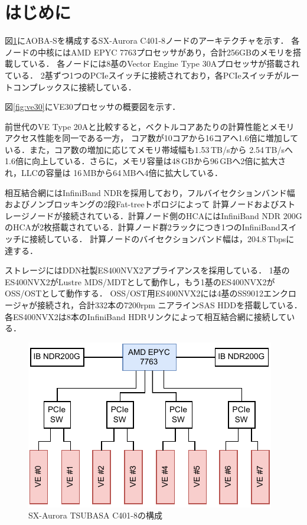 ﻿\documentclass[submit,techrep,noauthor]{ipsj}
\begin{document}
\maketitle

\section{はじめに}

図\ref{fig:node}にAOBA-Sを構成するSX-Aurora C401-8ノードのアーキテクチャを示す．
各ノードの中核にはAMD EPYC 7763プロセッサがあり，合計256GBのメモリを搭載している．
各ノードには8基のVector Engine Type 30Aプロセッサが搭載されている．
2基ずつ1つのPCIeスイッチに接続されており，各PCIeスイッチがルートコンプレックスに接続している．

図\ref{fig:ve30}にVE30プロセッサの概要図を示す．

前世代のVE Type 20Aと比較すると，ベクトルコアあたりの計算性能とメモリアクセス性能を同一である一方，
コア数が10コアから16コアへ1.6倍に増加している．また，コア数の増加に応じてメモリ帯域幅も1.53\,TB/sから
2.54\,TB/sへ1.6倍に向上している．さらに，メモリ容量は48\,GBから96\,GBへ2倍に拡大され，LLCの容量は
16\,MBから64\,MBへ4倍に拡大している．

相互結合網にはInfiniBand
NDRを採用しており，フルバイセクションバンド幅およびノンブロッキングの2段Fat-treeトポロジによって
計算ノードおよびストレージノードが接続されている．計算ノード側のHCAにはInfiniBand NDR
200GのHCAが2枚搭載されている．計算ノード群2ラックにつき1つのInfiniBandスイッチに接続している．
計算ノードのバイセクションバンド幅は，204.8\,Tbpsに達する．

ストレージにはDDN社製ES400NVX2アプライアンスを採用している．
1基のES400NVX2がLustre MDS/MDTとして動作し，もう1基のES400NVX2がOSS/OSTとして動作する．
OSS/OST用ES400NVX2には4基のSS9012エンクロージャが接続され，合計332本の7200rpm ニアラインSAS
HDDを搭載している．各ES400NVX2は8本のInfiniBand HDRリンクによって相互結合網に接続している．

\begin{figure}
  \centering
  \includegraphics{figs/node_arch.pdf}
  \caption{SX-Aurora TSUBASA C401-8の構成}\label{fig:node}
\end{figure}
\end{document}
